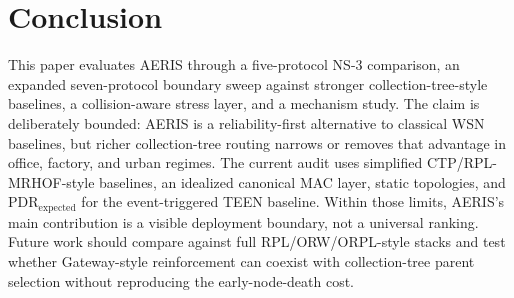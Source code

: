 \documentclass[conference]{IEEEtran}
\begin{document}
\section{Conclusion}
This paper evaluates AERIS through a five-protocol NS-3 comparison, an expanded seven-protocol boundary sweep against stronger collection-tree-style baselines, a collision-aware stress layer, and a mechanism study. The claim is deliberately bounded: AERIS is a reliability-first alternative to classical WSN baselines, but richer collection-tree routing narrows or removes that advantage in office, factory, and urban regimes. The current audit uses simplified CTP/RPL-MRHOF-style baselines, an idealized canonical MAC layer, static topologies, and $\mathrm{PDR}_{\mathrm{expected}}$ for the event-triggered TEEN baseline. Within those limits, AERIS's main contribution is a visible deployment boundary, not a universal ranking. Future work should compare against full RPL/ORW/ORPL-style stacks and test whether Gateway-style reinforcement can coexist with collection-tree parent selection without reproducing the early-node-death cost.

\FloatBarrier


\end{document}
